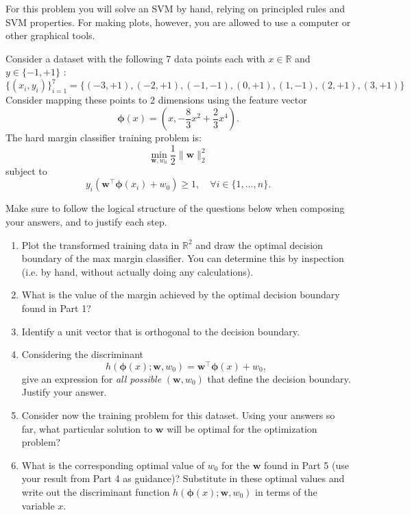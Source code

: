 \documentclass[submit]{../harvardml}
\begin{document}
\begin{problem}
  For this problem you will solve an SVM by hand, relying on principled rules and SVM properties. 
  For making plots, however, you are allowed to use a computer or other graphical tools.

  Consider a dataset with the following 7 data points each with $x \in \mathbb{R}$ and $y \in \{ -1, +1 \}$ : 
  \[
    \{(x_i, y_i)\}_{i = 1}^7 =\{(-3 , +1) , (-2 , +1 ) , (-1,  -1 ), (0, +1), ( 1 , -1 ), ( 2 , +1 ) , (3 , +1 )\}
  \]
  Consider mapping these points to $2$ dimensions using the feature vector 
  \[
    \boldsymbol{\phi}(x) =  \left(x, -\frac{8}{3}x^2 + \frac{2}{3}x^4\right).
  \]
  The hard margin classifier training problem is:
  \[
    \min_{\mathbf{w}, w_0} \frac{1}{2}\|\mathbf{w}\|_2^2 
  \]
  subject to 
  \[
    y_i\left(\mathbf{w}^\top \boldsymbol{\phi}(x_i) + w_0\right) \geq 1, \quad \forall i \in \{1,\ldots, n\}.
  \]

  Make sure to follow the logical structure of the questions below when composing your answers, and to justify each step.

  \begin{enumerate}
    \item Plot the transformed training data in $\mathbb{R}^2$ and draw the optimal decision boundary of the max margin classifier. You can determine this by inspection (i.e. by hand, without actually doing any calculations).

    \item What is the value of the margin achieved by the optimal decision boundary found in Part 1? 

    \item Identify a unit vector that is orthogonal to the decision boundary.

    \item Considering the discriminant 
      \[
        h(\boldsymbol{\phi}(x);\mathbf{w},w_0)=\mathbf{w}^\top\boldsymbol{\phi}(x) +w_0,
      \]
      give an expression for \emph{all possible} $(\mathbf{w},w_0)$ that define the decision boundary. Justify your answer.

    \item Consider now the training problem for this dataset. Using your answers so far, what particular solution to $\mathbf{w}$ will be optimal for the optimization problem?

    \item What is the corresponding optimal value of $w_0$ for the $\mathbf{w}$ found in Part 5 (use your result from Part 4 as guidance)? Substitute in these optimal values and write out the discriminant function $h(\boldsymbol{\phi}(x);\mathbf{w},w_0)$ in terms of the variable $x$.


\end{enumerate}
\end{problem}
\end{document}
